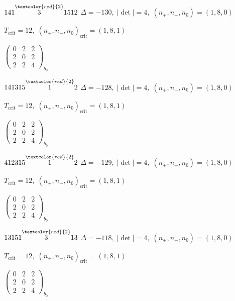 \documentclass[10pt]{article}
\begin{document}
\smallskip

$141\overset{\textcolor{red}{2}}{3}1512$ \quad $\Delta=-130,\; |\det|=4,\; (n_+,n_-,n_0)=(1,8,0)$

\hspace{1em}$T_{\text{crit}}=12,\; (n_+,n_-,n_0)_{\text{crit}}=(1,8,1)$

\hspace{2em}$\left(\begin{smallmatrix}0 & 2 & 2 \\ 2 & 0 & 2 \\ 2 & 2 & 4\end{smallmatrix}\right)_{\!b_0}$

$141315\overset{\textcolor{red}{2}}{1}2$ \quad $\Delta=-128,\; |\det|=4,\; (n_+,n_-,n_0)=(1,8,0)$

\hspace{1em}$T_{\text{crit}}=12,\; (n_+,n_-,n_0)_{\text{crit}}=(1,8,1)$

\hspace{2em}$\left(\begin{smallmatrix}0 & 2 & 2 \\ 2 & 0 & 2 \\ 2 & 2 & 4\end{smallmatrix}\right)_{\!b_0}$

\smallskip

$412315\overset{\textcolor{red}{2}}{1}2$ \quad $\Delta=-129,\; |\det|=4,\; (n_+,n_-,n_0)=(1,8,0)$

\hspace{1em}$T_{\text{crit}}=12,\; (n_+,n_-,n_0)_{\text{crit}}=(1,8,1)$

\hspace{2em}$\left(\begin{smallmatrix}0 & 2 & 2 \\ 2 & 0 & 2 \\ 2 & 2 & 4\end{smallmatrix}\right)_{\!b_0}$

\smallskip

$13151\overset{\textcolor{red}{2}}{3}13$ \quad $\Delta=-118,\; |\det|=4,\; (n_+,n_-,n_0)=(1,8,0)$

\hspace{1em}$T_{\text{crit}}=12,\; (n_+,n_-,n_0)_{\text{crit}}=(1,8,1)$

\hspace{2em}$\left(\begin{smallmatrix}0 & 2 & 2 \\ 2 & 0 & 2 \\ 2 & 2 & 4\end{smallmatrix}\right)_{\!b_0}$
\end{document}

